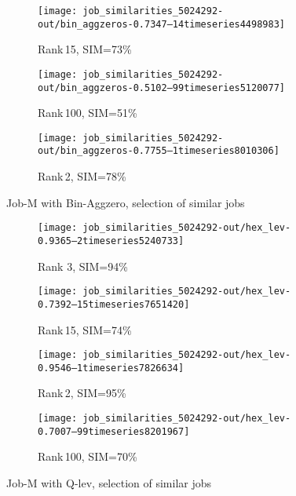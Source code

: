 \documentclass{jhps}
\begin{document}
\begin{figure}[bt]
\begin{subfigure}{0.47\textwidth}
\centering
\texttt{[image: job\_similarities\_5024292-out/bin\_aggzeros-0.7347--14timeseries4498983]}
\caption{Rank\,15, SIM=73\%}
\end{subfigure}
\begin{subfigure}{0.47\textwidth}
\centering
\texttt{[image: job\_similarities\_5024292-out/bin\_aggzeros-0.5102--99timeseries5120077]}
\caption{Rank\,100, SIM=51\% }
\end{subfigure}

\begin{subfigure}{0.47\textwidth}
\centering
\texttt{[image: job\_similarities\_5024292-out/bin\_aggzeros-0.7755--1timeseries8010306]}
\caption{Rank\,2, SIM=78\%}
\end{subfigure}
\caption{Job-M with Bin-Aggzero, selection of similar jobs}%
\label{fig:job-M-bin-aggzero}
\end{figure}



\begin{figure}[bt]
\begin{subfigure}{0.47\textwidth}
\centering
\texttt{[image: job\_similarities\_5024292-out/hex\_lev-0.9365--2timeseries5240733]}
\caption{Rank 3, SIM=94\%}
\end{subfigure}
\begin{subfigure}{0.47\textwidth}
\texttt{[image: job\_similarities\_5024292-out/hex\_lev-0.7392--15timeseries7651420]}
\caption{Rank\,15, SIM=74\%}
\end{subfigure}

\begin{subfigure}{0.47\textwidth}
\centering
\texttt{[image: job\_similarities\_5024292-out/hex\_lev-0.9546--1timeseries7826634]}
\caption{Rank\,2, SIM=95\%}
\end{subfigure}
\begin{subfigure}{0.47\textwidth}
\centering
\texttt{[image: job\_similarities\_5024292-out/hex\_lev-0.7007--99timeseries8201967]}
\caption{Rank\,100, SIM=70\%}
\end{subfigure}

\caption{Job-M with Q-lev, selection of similar jobs}%
\label{fig:job-M-hex-lev}
\end{figure}
\end{document}
